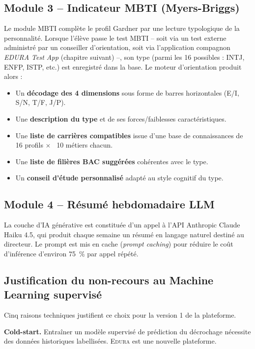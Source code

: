 \documentclass[12pt,a4paper,oneside]{report}
\newcommand{\edura}{\textsc{Edura}}
\begin{document}
\subsection{Module 3 -- Indicateur MBTI (Myers-Briggs)}

Le module MBTI complète le profil Gardner par une lecture typologique de la personnalité. Lorsque l'élève passe le test MBTI -- soit via un test externe administré par un conseiller d'orientation, soit via l'application compagnon \textit{EDURA Test App} (chapitre suivant) --, son type (parmi les 16 possibles : INTJ, ENFP, ISTP, etc.) est enregistré dans la base. Le moteur d'orientation produit alors :

\begin{itemize}
  \item Un \textbf{décodage des 4 dimensions} sous forme de barres horizontales (E/I, S/N, T/F, J/P).
  \item Une \textbf{description du type} et de ses forces/faiblesses caractéristiques.
  \item Une \textbf{liste de carrières compatibles} issue d'une base de connaissances de 16 profils $\times$ ~10 métiers chacun.
  \item Une \textbf{liste de filières BAC suggérées} cohérentes avec le type.
  \item Un \textbf{conseil d'étude personnalisé} adapté au style cognitif du type.
\end{itemize}

\subsection{Module 4 -- Résumé hebdomadaire LLM}

La couche d'IA générative est constituée d'un appel à l'API Anthropic Claude Haiku 4.5, qui produit chaque semaine un résumé en langage naturel destiné au directeur. Le prompt est mis en cache (\textit{prompt caching}) pour réduire le coût d'inférence d'environ 75~\% par appel répété.

\subsection{Justification du non-recours au Machine Learning supervisé}

Cinq raisons techniques justifient ce choix pour la version 1 de la plateforme.

\textbf{Cold-start.} Entraîner un modèle supervisé de prédiction du décrochage nécessite des données historiques labellisées. \edura{} est une nouvelle plateforme.
\end{document}
